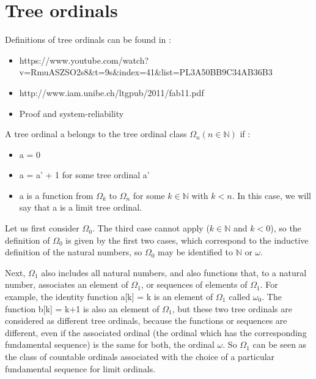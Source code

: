 \documentclass[10pt]{article}
\begin{document}
\section{Tree ordinals}

Definitions of tree ordinals can be found in :

\begin{itemize}
     \setlength{\itemsep}{1pt}
     \setlength{\parskip}{0pt}
     \setlength{\parsep}{0pt}
\item https://www.youtube.com/watch?v=RmuASZSO2s8\&t=9s\&index=41\&list=PL3A50BB9C34AB36B3
\item http://www.iam.unibe.ch/ltgpub/2011/fab11.pdf
\item Proof and system-reliability
\end{itemize}

A tree ordinal a belongs to the tree ordinal class \( \Omega_n (n \in \mathbb{N}) \) if :
\begin{itemize}
     \setlength{\itemsep}{1pt}
     \setlength{\parskip}{0pt}
     \setlength{\parsep}{0pt}
\item a = 0
\item a = a' + 1 for some tree ordinal a'
\item a is a function from \( \Omega_k \) to \( \Omega_n \) for some \( k \in \mathbb{N} \) with \( k < n \). In this case, we will say that a is a limit tree ordinal.
\end{itemize}

Let us first consider \( \Omega_0 \). The third case cannot apply (\( k \in \mathbb{N} \) and \(k < 0 \)), so the definition of \( \Omega_0 \) is given by the first two cases, which correspond to the inductive definition of the natural numbers, so \( \Omega_0 \) may be identified to \( \mathbb{N} \) or \( \omega \).

Next, \( \Omega_1 \) also includes all natural numbers, and also functions that, to a natural number, associates an element of \( \Omega_1 \), or sequences of elements of \( \Omega_1 \). For example, the identity function a[k] = k is an element of \( \Omega_1 \) called \( \omega_0 \). The function b[k] = k+1 is also an element of \( \Omega_1 \), but these two tree ordinals are considered as different tree ordinals, because the functions or sequences are different, even if the associated ordinal (the ordinal which has the corresponding fundamental sequence) is the same for both, the ordinal \( \omega \). So \( \Omega_1 \) can be seen as the class of countable ordinals associated with the choice of a particular fundamental sequence for limit ordinals.
\end{document}
